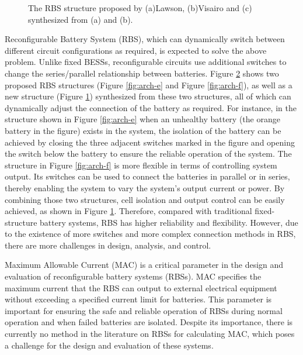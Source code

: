 \documentclass{article}
\begin{document}
\begin{figure}[htbp]
\begin{subfigure}[b]{0.3\textwidth}
        \caption{}
        \label{fig:arch-ef}
    \end{subfigure}
    \caption{The RBS structure proposed by (a)Lawson\cite{lawsonSoftwareConfigurableBattery2012}, (b)Visairo\cite{visairoReconfigurableBatteryPack2008} and (c) synthesized from (a) and (b).}
    \label{fig:arch}
\end{figure}

Reconfigurable Battery System (RBS), which can dynamically switch between different circuit configurations as required, is expected to solve the above problem\cite{hanNextGenerationBatteryManagement2020a}. 
Unlike fixed BESSs, reconfigurable circuits use additional switches to change the series/parallel relationship between batteries.
Figure \ref{fig:arch} shows two proposed RBS structures (Figure \ref{fig:arch-e} and Figure \ref{fig:arch-f}), as well as a new structure (Figure \ref{fig:arch-ef}) synthesized from these two structures, all of which can dynamically adjust the connection of the battery as required.
For instance, in the structure shown in Figure \ref{fig:arch-e} when an unhealthy battery (the orange battery in the figure) exists in the system, the isolation of the battery can be achieved by closing the three adjacent switches marked in the figure and opening the switch below the battery to ensure the reliable operation of the system.
The structure in Figure \ref{fig:arch-f} is more flexible in terms of controlling system output.
Its switches can be used to connect the batteries in parallel or in series, thereby enabling the system to vary the system's output current or power.
By combining those two structures, cell isolation and output control can be easily achieved, as shown in Figure \ref{fig:arch-ef}. 
Therefore, compared with traditional fixed-structure battery systems, RBS has higher reliability and flexibility. 
However, due to the existence of more switches and more complex connection methods in RBS, there are more challenges in design, analysis, and control.


Maximum Allowable Current (MAC) is a critical parameter in the design and evaluation of reconfigurable battery systems (RBSs).
MAC specifies the maximum current that the RBS can output to external electrical equipment without exceeding a specified current limit for batteries.
This parameter is important for ensuring the safe and reliable operation of RBSs during normal operation and when failed batteries are isolated.
Despite its importance, there is currently no method in the literature on RBSs for calculating MAC, which poses a challenge for the design and evaluation of these systems.
\end{document}
